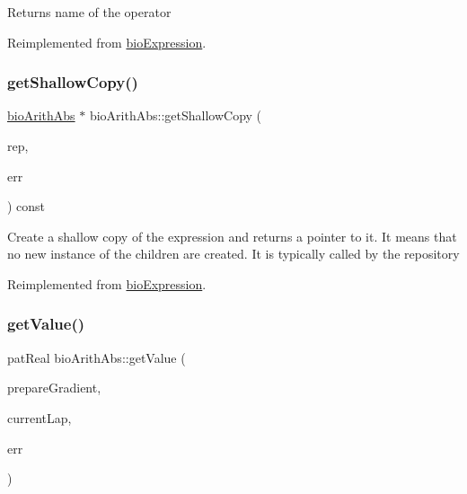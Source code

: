\begin{DoxyReturn}{Returns}
name of the operator 
\end{DoxyReturn}


Reimplemented from \hyperlink{classbio_expression_a2353a4afb3a2b0af7c63aba086a72bde}{bio\+Expression}.

\mbox{\label{classbio_arith_abs_a52b8f4ba02b450fa3b9624c8d791009e}} 
\subsubsection{\texorpdfstring{get\+Shallow\+Copy()}{getShallowCopy()}}
{\footnotesize\ttfamily \hyperlink{classbio_arith_abs}{bio\+Arith\+Abs} $\ast$ bio\+Arith\+Abs\+::get\+Shallow\+Copy (\begin{DoxyParamCaption}\item[{\hyperlink{classbio_expression_repository}{bio\+Expression\+Repository} $\ast$}]{rep,  }\item[{pat\+Error $\ast$\&}]{err }\end{DoxyParamCaption}) const\hspace{0.3cm}{\ttfamily [virtual]}}

Create a shallow copy of the expression and returns a pointer to it. It means that no new instance of the children are created. It is typically called by the repository 

Reimplemented from \hyperlink{classbio_expression_a442534762693b92baaf33928979a1bf8}{bio\+Expression}.

\mbox{\label{classbio_arith_abs_a4caa32d24495b1204a0ae99d0be72934}} 
\subsubsection{\texorpdfstring{get\+Value()}{getValue()}}
{\footnotesize\ttfamily pat\+Real bio\+Arith\+Abs\+::get\+Value (\begin{DoxyParamCaption}\item[{pat\+Boolean}]{prepare\+Gradient,  }\item[{pat\+U\+Long}]{current\+Lap,  }\item[{pat\+Error $\ast$\&}]{err }\end{DoxyParamCaption})\hspace{0.3cm}{\ttfamily [virtual]}}

